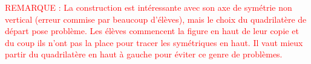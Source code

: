 \begin{multicols}{2}
\begin{questions}
	\end{questions}
\end{multicols}

\textcolor{red}{
REMARQUE :
La construction est intéressante avec son axe de symétrie non vertical (erreur commise par beaucoup d'élèves), mais le choix du quadrilatère de départ pose problème. Les élèves commencent la figure en haut de leur copie et du coup ils n'ont pas la place pour tracer les symétriques en haut. Il vaut mieux partir du quadrilatère en haut à gauche pour éviter ce genre de problèmes.
}
